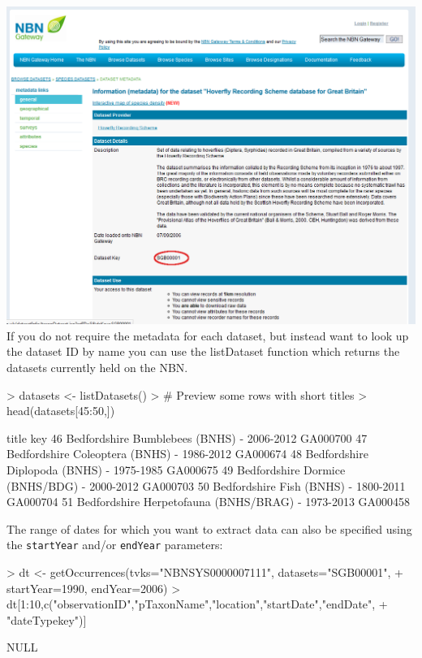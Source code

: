 \documentclass{article}
\begin{document}
\includegraphics[width=1\textwidth]{NBN_dataset_details.png}
\\[12pt]

If you do not require the metadata for each dataset, but instead want to look
up the dataset ID by name you can use the listDataset function which returns the
datasets currently held on the NBN.

\begin{Schunk}
\begin{Sinput}
> datasets <- listDatasets()
> # Preview some rows with short titles
> head(datasets[45:50,])
\end{Sinput}
\begin{Soutput}
                                                title      key
46        Bedfordshire Bumblebees (BNHS) -  2006-2012 GA000700
47         Bedfordshire Coleoptera (BNHS) - 1986-2012 GA000674
48          Bedfordshire Diplopoda (BNHS) - 1975-1985 GA000675
49       Bedfordshire Dormice (BNHS/BDG) -  2000-2012 GA000703
50               Bedfordshire Fish (BNHS) - 1800-2011 GA000704
51 Bedfordshire Herpetofauna (BNHS/BRAG) -  1973-2013 GA000458
\end{Soutput}
\end{Schunk}

The range of dates for which you want to extract data can also be specified 
using the \texttt{startYear} and/or \texttt{endYear} parameters:

\begin{Schunk}
\begin{Sinput}
> dt <- getOccurrences(tvks="NBNSYS0000007111", datasets="SGB00001", 
+                      startYear=1990, endYear=2006)
> dt[1:10,c("observationID","pTaxonName","location","startDate","endDate",
+           "dateTypekey")]
\end{Sinput}
\begin{Soutput}
NULL
\end{Soutput}
\end{Schunk}
\end{document}
